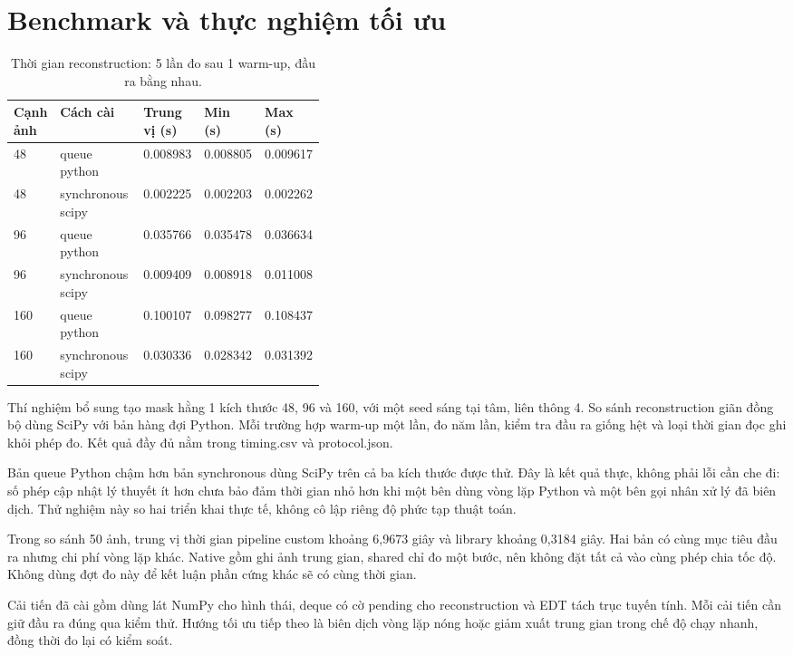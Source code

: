 \documentclass[12pt,a4paper,oneside]{report}
\begin{document}
\section{Benchmark và thực nghiệm tối ưu}
\begin{table}[H]\centering\small
\caption{Thời gian reconstruction: 5 lần đo sau 1 warm-up, đầu ra bằng nhau.}\label{tab:timing}
\begin{tabularx}{\linewidth}{p{0.10\linewidth} p{0.30\linewidth} X X X}
\toprule
\textbf{Cạnh ảnh} & \textbf{Cách cài} & \textbf{Trung vị (s)} & \textbf{Min (s)} & \textbf{Max (s)} \\ \midrule
48 & queue python & 0.008983 & 0.008805 & 0.009617 \\
48 & synchronous scipy & 0.002225 & 0.002203 & 0.002262 \\
96 & queue python & 0.035766 & 0.035478 & 0.036634 \\
96 & synchronous scipy & 0.009409 & 0.008918 & 0.011008 \\
160 & queue python & 0.100107 & 0.098277 & 0.108437 \\
160 & synchronous scipy & 0.030336 & 0.028342 & 0.031392 \\
\bottomrule\end{tabularx}\end{table}


Thí nghiệm bổ sung tạo mask hằng 1 kích thước 48, 96 và 160, với một seed sáng tại tâm, liên thông 4. So sánh reconstruction giãn đồng bộ dùng SciPy với bản hàng đợi Python. Mỗi trường hợp warm-up một lần, đo năm lần, kiểm tra đầu ra giống hệt và loại thời gian đọc ghi khỏi phép đo. Kết quả đầy đủ nằm trong timing.csv và protocol.json.

Bản queue Python chậm hơn bản synchronous dùng SciPy trên cả ba kích thước được thử. Đây là kết quả thực, không phải lỗi cần che đi: số phép cập nhật lý thuyết ít hơn chưa bảo đảm thời gian nhỏ hơn khi một bên dùng vòng lặp Python và một bên gọi nhân xử lý đã biên dịch. Thử nghiệm này so hai triển khai thực tế, không cô lập riêng độ phức tạp thuật toán.

Trong so sánh 50 ảnh, trung vị thời gian pipeline custom khoảng 6,9673 giây và library khoảng 0,3184 giây. Hai bản có cùng mục tiêu đầu ra nhưng chi phí vòng lặp khác. Native gồm ghi ảnh trung gian, shared chỉ đo một bước, nên không đặt tất cả vào cùng phép chia tốc độ. Không dùng đợt đo này để kết luận phần cứng khác sẽ có cùng thời gian.

Cải tiến đã cài gồm dùng lát NumPy cho hình thái, deque có cờ pending cho reconstruction và EDT tách trục tuyến tính. Mỗi cải tiến cần giữ đầu ra đúng qua kiểm thử. Hướng tối ưu tiếp theo là biên dịch vòng lặp nóng hoặc giảm xuất trung gian trong chế độ chạy nhanh, đồng thời đo lại có kiểm soát.
\end{document}
